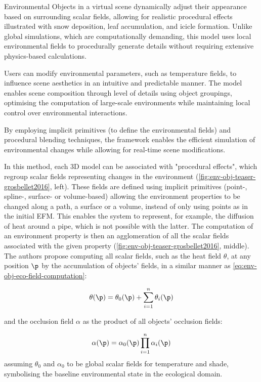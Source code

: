 \begin{Itemize}
    \Item{} Environmental Objects in a virtual scene dynamically adjust their appearance based on surrounding scalar fields, allowing for realistic procedural effects illustrated with snow deposition, leaf accumulation, and icicle formation. Unlike global simulations, which are computationally demanding, this model uses local environmental fields to procedurally generate details without requiring extensive physics-based calculations.

    \Item{} Users can modify environmental parameters, such as temperature fields, to influence scene aesthetics in an intuitive and predictable manner. The model enables scene composition through level of details using object groupings, optimising the computation of large-scale environments while maintaining local control over environmental interactions.
\end{Itemize}
By employing implicit primitives (to define the environmental fields) and procedural blending techniques, the framework enables the efficient simulation of environmental changes while allowing for real-time scene modifications.

In this method, each 3D model can be associated with "procedural effects", which regroup scalar fields representing changes in the environment (\cref{fig:env-obj-teaser-grosbellet2016}, left). These fields are defined using implicit primitives (point-, spline-, surface- or volume-based) allowing the environment properties to be changed along a path, a surface or a volume, instead of only using points as in the initial EFM. This enables the system to represent, for example, the diffusion of heat around a pipe, which is not possible with the latter. The computation of an environment property is then an agglomeration of all the scalar fields associated with the given property (\cref{fig:env-obj-teaser-grosbellet2016}, middle). The authors propose computing all scalar fields, such as the heat field $\theta$, at any position $\p$ by the accumulation of objects' fields, in a similar manner as \cref{eq:env-obj-eco-field-computation}:

\begin{align}
    \theta(\p) = \theta_0(\p) + \sum_{i=1}^{n}{ \theta_i(\p)}
\end{align}

and the occlusion field $\alpha$ as the product of all objects' occlusion fields:

\begin{align}
    \alpha(\p) = \alpha_0(\p) \prod_{i=1}^{n}{\alpha_i(\p)}
\end{align}
assuming $\theta_0$ and $\alpha_0$ to be global scalar fields for temperature and shade, symbolising the baseline environmental state in the ecological domain.

